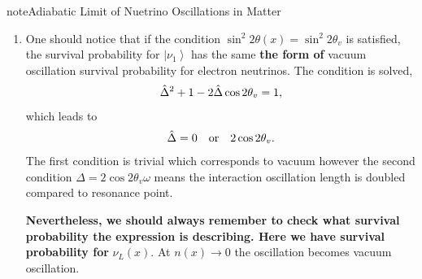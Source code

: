 \documentclass[letterpaper,12pt,english]{sphinxmanual}
\newcommand{\ket}[1]{\left| #1\right\rangle}
\begin{document}
\begin{notice}{note}{Adiabatic Limit of Nuetrino Oscillations in Matter}
\begin{enumerate}
\item {} 
One should notice that if the condition \(\sin^2 2\theta(x) = \sin^2 2\theta_v\) is satisfied, the survival probability for \(\ket{\nu_1}\) has the same \textbf{the form of} vacuum oscillation survival probability for electron neutrinos. The condition is solved,
\begin{gather}
\begin{split}\hat\Delta^2 + 1 - 2\hat\Delta \cos 2\theta_v = 1,\end{split}\notag
\end{gather}
which leads to
\begin{gather}
\begin{split}\hat\Delta = 0 \quad\text{or}\quad 2\cos 2\theta_v .\end{split}\notag
\end{gather}
The first condition is trivial which corresponds to vacuum however the second condition \(\Delta = 2\cos 2\theta_v \omega\) means the interaction oscillation length is doubled compared to resonance point.

\textbf{Nevertheless, we should always remember to check what survival probability the expression is describing. Here we have survival probability for} \(\nu_L(x)\). At \(n(x)\to 0\) the oscillation becomes vacuum oscillation.

\end{enumerate}
\end{notice}
\end{document}
